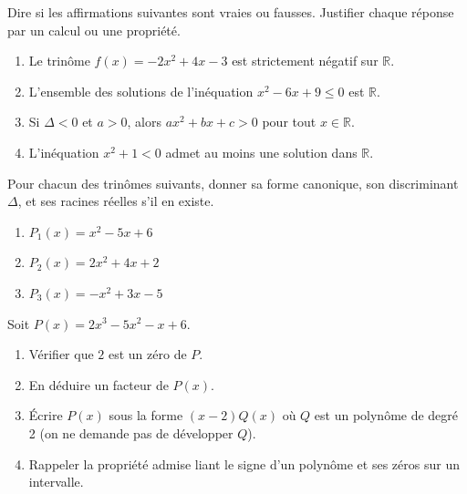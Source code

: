 \documentclass[11pt]{article}
\newcounter{popsec}
\newcounter{popsub}
\newcommand{\courssub}[1]{%
  \stepcounter{popsub}%
  \par\vspace{9pt}\noindent{\popxbold\fontsize{11.5}{13}\selectfont\color{popink}{\color{poporange}\thepopsec.\thepopsub}\hspace{6pt}#1}\par\nopagebreak\vspace{4pt}
}
\begin{document}
\begin{exercice}
Dire si les affirmations suivantes sont vraies ou fausses. Justifier chaque réponse par un calcul ou une propriété.
\begin{enumerate}
    \item Le trinôme $f(x) = -2x^2 + 4x - 3$ est strictement négatif sur $\mathbb{R}$.
    \item L'ensemble des solutions de l'inéquation $x^2 - 6x + 9 \le 0$ est $\mathbb{R}$.
    \item Si $\Delta < 0$ et $a > 0$, alors $ax^2+bx+c > 0$ pour tout $x \in \mathbb{R}$.
    \item L'inéquation $x^2 + 1 < 0$ admet au moins une solution dans $\mathbb{R}$.
\end{enumerate}
\end{exercice}

\begin{exercice}
Pour chacun des trinômes suivants, donner sa forme canonique, son discriminant $\Delta$, et ses racines réelles s'il en existe.
\begin{enumerate}
    \item $P_1(x) = x^2 - 5x + 6$
    \item $P_2(x) = 2x^2 + 4x + 2$
    \item $P_3(x) = -x^2 + 3x - 5$
\end{enumerate}
\end{exercice}

\begin{exercice}
Soit $P(x) = 2x^3 - 5x^2 - x + 6$.
\begin{enumerate}
    \item Vérifier que $2$ est un zéro de $P$.
    \item En déduire un facteur de $P(x)$.
    \item Écrire $P(x)$ sous la forme $(x-2)Q(x)$ où $Q$ est un polynôme de degré 2 (on ne demande pas de développer $Q$).
    \item Rappeler la propriété admise liant le signe d'un polynôme et ses zéros sur un intervalle.
\end{enumerate}
\end{exercice}

\courssub{Je m'entraîne}
\end{document}
